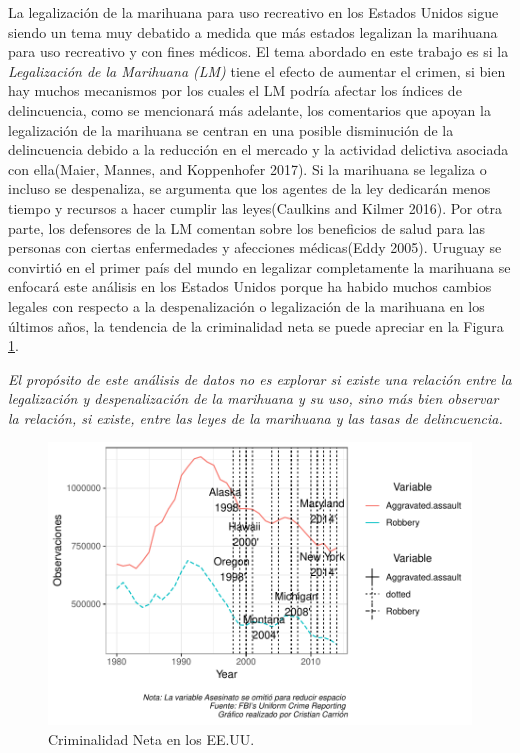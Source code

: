 \documentclass[11pt,]{article}
\begin{document}
La legalización de la marihuana para uso recreativo en los Estados
Unidos sigue siendo un tema muy debatido a medida que más estados
legalizan la marihuana para uso recreativo y con fines médicos. El tema
abordado en este trabajo es si la \emph{Legalización de la Marihuana
(LM)} tiene el efecto de aumentar el crimen, si bien hay muchos
mecanismos por los cuales el LM podría afectar los índices de
delincuencia, como se mencionará más adelante, los comentarios que
apoyan la legalización de la marihuana se centran en una posible
disminución de la delincuencia debido a la reducción en el mercado y la
actividad delictiva asociada con ella(Maier, Mannes, and Koppenhofer
2017). Si la marihuana se legaliza o incluso se despenaliza, se
argumenta que los agentes de la ley dedicarán menos tiempo y recursos a
hacer cumplir las leyes(Caulkins and Kilmer 2016). Por otra parte, los
defensores de la LM comentan sobre los beneficios de salud para las
personas con ciertas enfermedades y afecciones médicas(Eddy 2005).
Uruguay se convirtió en el primer país del mundo en legalizar
completamente la marihuana se enfocará este análisis en los Estados
Unidos porque ha habido muchos cambios legales con respecto a la
despenalización o legalización de la marihuana en los últimos años, la
tendencia de la criminalidad neta se puede apreciar en la Figura
\ref{fig:plot1}.

\emph{El propósito de este análisis de datos no es explorar si existe
una relación entre la legalización y despenalización de la marihuana y
su uso, sino más bien observar la relación, si existe, entre las leyes
de la marihuana y las tasas de delincuencia.}

\begin{figure}
\centering
\includegraphics{mar_doc_files/figure-latex/graph1-1.pdf}
\caption{\label{fig:plot1} Criminalidad Neta en los EE.UU.}
\end{figure}
\end{document}
